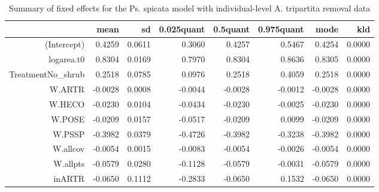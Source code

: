 \begin{table}[ht]
\centering
\caption{Summary of fixed effects for the Ps. spicata model with individual-level A. tripartita removal data} 
\label{PSSPgrowth-inARTR}
\begin{tabular}{rrrrrrrr}
  \hline
 & mean & sd & 0.025quant & 0.5quant & 0.975quant & mode & kld \\ 
  \hline
(Intercept) & 0.4259 & 0.0611 & 0.3060 & 0.4257 & 0.5467 & 0.4254 & 0.0000 \\ 
  logarea.t0 & 0.8304 & 0.0169 & 0.7970 & 0.8304 & 0.8636 & 0.8305 & 0.0000 \\ 
  TreatmentNo\_shrub & 0.2518 & 0.0785 & 0.0976 & 0.2518 & 0.4059 & 0.2518 & 0.0000 \\ 
  W.ARTR & -0.0028 & 0.0008 & -0.0044 & -0.0028 & -0.0012 & -0.0028 & 0.0000 \\ 
  W.HECO & -0.0230 & 0.0104 & -0.0434 & -0.0230 & -0.0025 & -0.0230 & 0.0000 \\ 
  W.POSE & -0.0209 & 0.0157 & -0.0517 & -0.0209 & 0.0099 & -0.0209 & 0.0000 \\ 
  W.PSSP & -0.3982 & 0.0379 & -0.4726 & -0.3982 & -0.3238 & -0.3982 & 0.0000 \\ 
  W.allcov & -0.0054 & 0.0015 & -0.0083 & -0.0054 & -0.0026 & -0.0054 & 0.0000 \\ 
  W.allpts & -0.0579 & 0.0280 & -0.1128 & -0.0579 & -0.0031 & -0.0579 & 0.0000 \\ 
  inARTR & -0.0650 & 0.1112 & -0.2833 & -0.0650 & 0.1532 & -0.0650 & 0.0000 \\ 
   \hline
\end{tabular}
\end{table}

